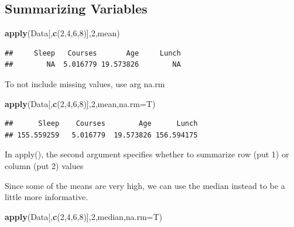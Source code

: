\documentclass[
  openany]{book}
\newenvironment{Shaded}{\begin{snugshade}}{\end{snugshade}}
\newcommand{\AttributeTok}[1]{\textcolor[rgb]{0.13,0.29,0.53}{#1}}
\newcommand{\DecValTok}[1]{\textcolor[rgb]{0.00,0.00,0.81}{#1}}
\newcommand{\FunctionTok}[1]{\textcolor[rgb]{0.13,0.29,0.53}{\textbf{#1}}}
\newcommand{\NormalTok}[1]{#1}
\begin{document}
\subsection{\texorpdfstring{\textbf{Summarizing Variables}}{Summarizing Variables}}\label{summarizing-variables}

\begin{Shaded}
\begin{Highlighting}[]
\FunctionTok{apply}\NormalTok{(Data[,}\FunctionTok{c}\NormalTok{(}\DecValTok{2}\NormalTok{,}\DecValTok{4}\NormalTok{,}\DecValTok{6}\NormalTok{,}\DecValTok{8}\NormalTok{)],}\DecValTok{2}\NormalTok{,mean)}
\end{Highlighting}
\end{Shaded}

\begin{verbatim}
##     Sleep   Courses       Age     Lunch 
##        NA  5.016779 19.573826        NA
\end{verbatim}

To not include missing values, use arg na.rm

\begin{Shaded}
\begin{Highlighting}[]
\FunctionTok{apply}\NormalTok{(Data[,}\FunctionTok{c}\NormalTok{(}\DecValTok{2}\NormalTok{,}\DecValTok{4}\NormalTok{,}\DecValTok{6}\NormalTok{,}\DecValTok{8}\NormalTok{)],}\DecValTok{2}\NormalTok{,mean,}\AttributeTok{na.rm=}\NormalTok{T)}
\end{Highlighting}
\end{Shaded}

\begin{verbatim}
##      Sleep    Courses        Age      Lunch 
## 155.559259   5.016779  19.573826 156.594175
\end{verbatim}

In apply(), the second argument specifies whether to summarize row (put 1) or column (put 2) values

Since some of the means are very high, we can use the median instead to be a little more informative.

\begin{Shaded}
\begin{Highlighting}[]
\FunctionTok{apply}\NormalTok{(Data[,}\FunctionTok{c}\NormalTok{(}\DecValTok{2}\NormalTok{,}\DecValTok{4}\NormalTok{,}\DecValTok{6}\NormalTok{,}\DecValTok{8}\NormalTok{)],}\DecValTok{2}\NormalTok{,median,}\AttributeTok{na.rm=}\NormalTok{T)}
\end{Highlighting}
\end{Shaded}
\end{document}
